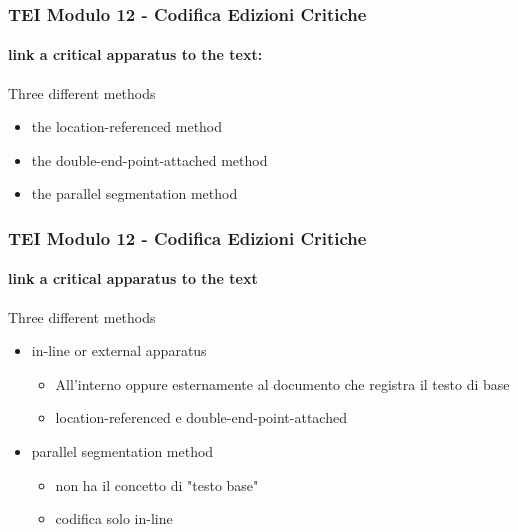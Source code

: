 \begin{frame}
    \frametitle{TEI Modulo 12 - Codifica Edizioni Critiche}
    \framesubtitle{link a critical apparatus to the text:}
    \addtocounter{nframe}{1}
    



    
    \begin{block}{Three different methods}
       \begin{itemize}
           \item the location-referenced method
           \item the double-end-point-attached method
           \item the parallel segmentation method
       \end{itemize}
     \end{block}


\end{frame}


\begin{frame}
    \frametitle{TEI Modulo 12 - Codifica Edizioni Critiche}
    \framesubtitle{link a critical apparatus to the text}
    \addtocounter{nframe}{1}
    
    \begin{block}{Three different methods}
       \begin{itemize}
           \item in-line or external apparatus
           \begin{itemize}
             \item All'interno oppure esternamente al documento che registra il testo di base
             \item location-referenced e double-end-point-attached
           \end{itemize}
           \item  parallel segmentation method
            \begin{itemize}
                \item non ha il concetto di "testo base"
                \item codifica solo in-line
            \end{itemize}
       \end{itemize}
     \end{block}

\end{frame}

